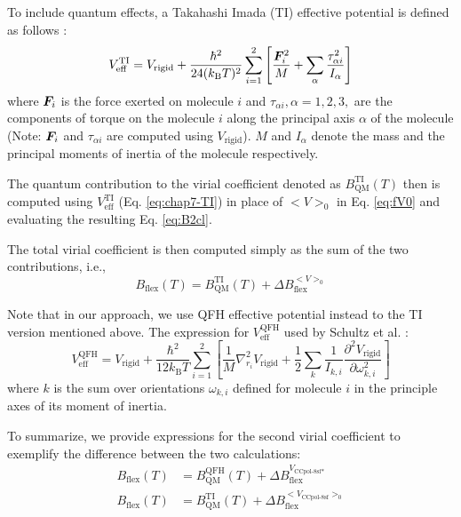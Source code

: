             To include quantum effects, a Takahashi Imada (TI) \cite{Takahashi1984} effective potential is defined as follows \cite{Schenter2002,Jankowski2015}:
            \begin{equation}
            \label{eq:chap7-TI}
                V^\text{TI}_\text{eff} = V_{\text{rigid}} + \displaystyle\frac{\hbar^2}{24 (k_\text{B} T)^2} \sum_{i = 1}^2 \left[ \frac{{\boldsymbol {F}}_i^2}{M} + \sum_\alpha \frac{\tau_{\alpha i}^2}{I_\alpha} \right]
            \end{equation}
            where ${\boldsymbol {F}}_i$ is the force exerted on molecule $i$ and $\tau_{\alpha i}, \alpha = 1, 2, 3,$ are the components of torque on the molecule $i$ along the principal axis $\alpha$ of the molecule (Note: ${\boldsymbol {F}}_i$ and $\tau_{\alpha i}$ are computed using $V_{\text{rigid}}$). $M$ and $I_\alpha$ denote the mass and the principal moments of inertia of the molecule respectively.

            The quantum contribution to the virial coefficient denoted as $B_\text{QM}^\text{TI} (T)$ then is computed using $V^\text{TI}_\text{eff}$ (Eq. \eqref{eq:chap7-TI}) in place of $<V>_0$ in Eq. \eqref{eq:fV0} and evaluating the resulting Eq. \eqref{eq:B2cl}.

            The total virial coefficient is then computed simply as the sum of the two contributions, i.e.,
            \begin{equation}
                 B_\text{flex} (T) = B_\text{QM}^\text{TI} (T) + \Delta B_\text{flex}^{<V>_0}
            \end{equation}

            Note that in our approach, we use QFH effective potential instead to the TI version mentioned above. The expression for $V^\text{QFH}_\text{eff}$ used by Schultz et al. \cite{Schultz2015,Feynman}:
            \begin{equation}
                \label{eq:chap7-QFH}
                V^\text{QFH}_\text{eff} = V_{\text{rigid}} + \displaystyle\frac{\hbar^2}{12 k_\text{B} T} \sum_{i = 1}^2 \left[ \frac{1}{M} \nabla^2_{r_i} V_\text{rigid} + \frac{1}{2} \sum_k \frac{1}{I_{k,i}} \frac{\partial^2 V_\text{rigid}}{\partial \omega_{k,i}^2} \right]
            \end{equation}
            where $k$ is the sum over orientations $\omega_{k,i}$ defined for molecule $i$ in the principle axes of its moment of inertia.
            
            To summarize, we provide expressions for the second virial coefficient to exemplify the difference between the two calculations:
            \begin{subequations}
                \label{eq:B2Total}
                \begin{align}
                    B_\text{flex} (T) &= B_\text{QM}^\text{QFH} (T) + \Delta B_\text{flex}^{V_\text{CCpol-8sf*}}\label{eq:b2ccpol8sf*}\\
                    B_\text{flex} (T) &= B_\text{QM}^\text{TI} (T) + \Delta B_\text{flex}^{<V_\text{CCpol-8sf}>_0}
                \end{align}
            \end{subequations}
